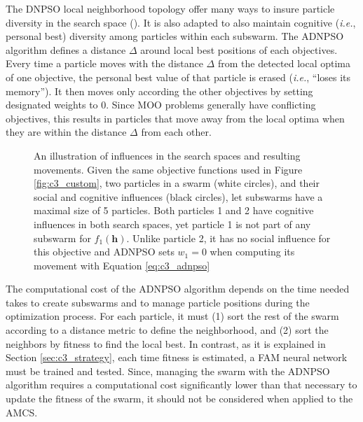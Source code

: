 The DNPSO local neighborhood topology offer many ways to insure particle diversity in the search space (\cite{nickabadi08_2}).
It is also adapted to also maintain cognitive (\emph{i.e.}, personal best) diversity among particles within each subswarm.
The ADNPSO algorithm defines a distance $\Delta$ around local best positions of each objectives.
Every time a particle moves with the distance $\Delta$ from the detected local optima of one objective, the personal best value of that particle is erased (\emph{i.e.}, ``loses its memory'').
It then moves only according the other objectives by setting designated weights to 0.
Since MOO problems generally have conflicting objectives, this results in particles that move away from the local optima when they are within the distance $\Delta$ from each other.

\begin{figure*}[t]
  \centering
  	\caption{An illustration of influences in the search spaces and resulting movements.
Given the same objective functions used in Figure \ref{fig:c3_custom}, two particles in a swarm (white circles), and their social and cognitive influences (black circles), let subswarms have a maximal size of 5 particles.
Both particles 1 and 2 have cognitive influences in both search spaces, yet particle 1 is not part of any subswarm for $f_1(\textbf{h})$. 
Unlike particle 2, it has no social influence for this objective and ADNPSO sets $w_1=0$ when computing its movement with Equation \ref{eq:c3_adnpso}}
	\label{fig:c3_influences}
\end{figure*}

The computational cost of the ADNPSO algorithm depends on the time needed takes to create subswarms and to manage particle positions during the optimization process.
For each particle, it must (1) sort the rest of the swarm according to a distance metric to define the neighborhood, and (2) sort the neighbors by fitness to find the local best.
In contrast, as it is explained in Section \ref{sec:c3_strategy}, each time fitness is estimated, a FAM neural network must be trained and tested.
Since, managing the swarm with the ADNPSO algorithm requires a computational cost significantly lower than that necessary to update the fitness of the swarm, 
it should not be considered when applied to the AMCS.

